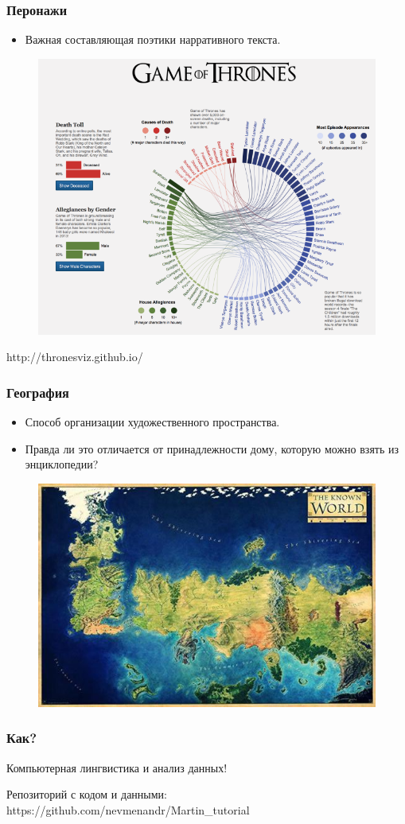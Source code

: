\documentclass{beamer}
\begin{document}
\begin{frame}
\frametitle{Перонажи}

\begin{itemize}
\item Важная составляющая поэтики нарративного текста.
\end{itemize} 

\begin{figure}
\includegraphics[width=0.5\linewidth]{got_heroes}
\end{figure}
http://thronesviz.github.io/
\end{frame}

\begin{frame}
\frametitle{География}

\begin{itemize}
\item Способ организации художественного пространства.
\item Правда ли это отличается от принадлежности дому, которую можно взять из энциклопедии?
\end{itemize} 

\begin{figure}
\includegraphics[width=0.5\linewidth]{Map}
\end{figure}
\end{frame}

\begin{frame}
\frametitle{Как?}

\begin{center}
	{\LARGE Компьютерная лингвистика и анализ данных!}
\end{center}

Репозиторий с кодом и данными: https://github.com/nevmenandr/Martin\_tutorial

\end{frame}
\end{document}
